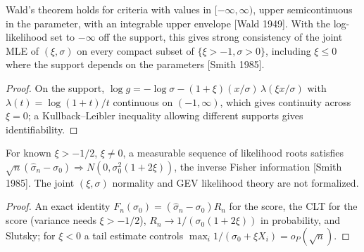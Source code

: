 \begin{theorem}
  \label{thm:wald-ereal}
  \leanok
  Wald's theorem holds for criteria with values in $[-\infty, \infty)$, upper semicontinuous in the parameter, with an
  integrable upper envelope [Wald 1949]. With the log-likelihood set to $-\infty$ off the support, this gives strong
  consistency of the joint MLE of $(\xi, \sigma)$ on every compact subset of $\{\xi > -1, \sigma > 0\}$, including $\xi \le 0$ where
  the support depends on the parameters [Smith 1985].
\end{theorem}
\begin{proof}
  \leanok
  On the support, $\log g = -\log\sigma - (1+\xi)(x/\sigma)\,\lambda(\xi x/\sigma)$ with $\lambda(t) = \log(1+t)/t$ continuous on $(-1,\infty)$, which
  gives continuity across $\xi = 0$; a Kullback--Leibler inequality allowing different supports gives identifiability.
\end{proof}

\begin{theorem}
  \label{thm:mle-scale-normality}
  \leanok
  For known $\xi > -1/2$, $\xi \ne 0$, a measurable sequence of likelihood roots satisfies
  $\sqrt n(\hat\sigma_n - \sigma_0) \Rightarrow N(0, \sigma_0^2(1 + 2\xi))$, the inverse Fisher information [Smith 1985]. The joint
  $(\xi, \sigma)$ normality and GEV likelihood theory are not formalized.
\end{theorem}
\begin{proof}
  \leanok
  An exact identity $F_n(\sigma_0) = (\hat\sigma_n - \sigma_0) R_n$ for the score, the CLT for the score (variance needs
  $\xi > -1/2$), $R_n \to 1/(\sigma_0(1+2\xi))$ in probability, and Slutsky; for $\xi < 0$ a tail estimate controls
  $\max_i 1/(\sigma_0 + \xi X_i) = o_P(\sqrt n)$.
\end{proof}

